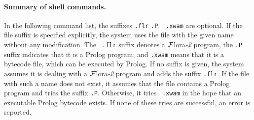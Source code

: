 \documentclass[11pt]{article}
\newcommand{\FLORA}{{\mbox{\sc ${\cal F}${lora}\rm\emph{-2}}}\xspace}
\newcommand{\ofile}{xwam}
\begin{document}
\paragraph{Summary of shell commands.}
In the following command list, the suffixes {\tt .flr} {\tt .P}, {\tt
  .\ofile} are optional. If the file suffix is specified explicitly, the
system uses the file with the given name without any modification. The {\tt
  .flr} suffix denotes a \FLORA program, the {\tt .P} suffix indicates that
it is a Prolog program, and {\tt .\ofile} means that it is a bytecode file,
which can be executed by Prolog.  If no suffix is given, the system assumes it
is dealing with a \FLORA program and adds the suffix {\tt .flr}. If the
file with such a name does not exist, it assumes that the file contains a
Prolog program and tries the suffix {\tt .P}. Otherwise, it tries {\tt
  .\ofile} in the hope that an executable Prolog bytecode exists. If none of
these tries are successful, an error is reported.
%
\end{document}

